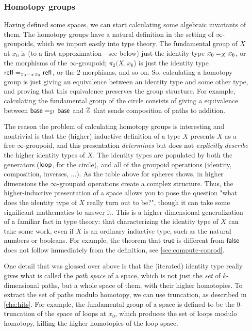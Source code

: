 \subsubsection{Homotopy groups}  Having defined some spaces, we can start
  calculating some algebraic invariants of them.  The homotopy groups
  have a natural definition in the setting of
  $\infty$-groupoids, which we import easily into type theory.  The fundamental group of $X$ at $x_0$
  is (to a first approximation---see below) just the identity type
  $\id[X] {x_0} {x_0}$, or the morphisms of the $\infty$-groupoid;
  $\pi_2(X,x_0$) is just the identity type $\id[{\id[X] {x_0} {x_0}}]
  {\refl{}}{\refl{}}$, or the 2-morphisms, and so on.  So, calculating a
  homotopy group is just giving an equivalence between an identity type
  and some other type, and proving that this equivalence preserves the
  group structure.  For example, calculating the fundamental group of
  the circle consists of giving a equivalence between $\id[{\Sn ^1}]
  \base \base$ and $\Z$ that sends composition of paths to
  addition.

The reason the problem of calculating homotopy groups is interesting and nontrivial is that the (higher) inductive
definition of a type $X$ presents $X$ as a free $\infty$-groupoid, and this
presentation \emph{determines} but does not \emph{explicitly describe}
the higher identity types of $X$.  The identity types are populated by
both the generators ($\lloop$, for the circle), and all of the groupoid
operations (identity, composition, inverses, ...).  As the table above
for spheres shows, in higher dimensions the $\infty$-groupoid operations
create a complex structure.  Thus, the higher-inductive
presentation of a space allows you to pose the question "what does the
identity type of $X$ really turn out to be?", though it can take some
significant mathematics to answer it.  This is a higher-dimensional
generalization of a familiar fact in type theory: that characterizing 
the identity type of $X$ can take some work, even if $X$ is an ordinary
inductive type, such as the natural numbers or booleans.  For example,
the theorem that $\mathsf{true}$ is different from $\mathsf{false}$ does not
follow immediately from the definition, see \autoref{sec:compute-coprod}.

One detail that was glossed over above is that the (iterated) identity
type really gives what is called the \emph{path space} of a space, which
is not just the \emph{set} of $k$-dimensional paths, but a whole space
of them, with their higher homotopies.  To extract the set of
paths modulo homotopy, we can use truncation, as described in
\autoref{cha:hits}.  For example, the fundamental group of a
space is defined to be the 0-truncation of the space of loops at $x_0$,
which produces the set of loops modulo homotopy, killing the higher
homotopies of the loop space.

